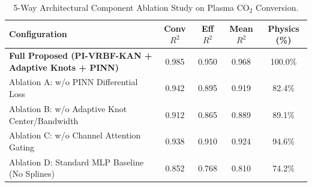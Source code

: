 \begin{table}[h]
\centering
\caption{5-Way Architectural Component Ablation Study on Plasma $\text{CO}_2$ Conversion.}
\label{tab:ablation}
\small
\begin{tabular}{lcccc}
\hline
\textbf{Configuration} & \textbf{Conv $R^2$} & \textbf{Eff $R^2$} & \textbf{Mean $R^2$} & \textbf{Physics (\%)} \\
\hline
\textbf{Full Proposed (PI-VRBF-KAN + Adaptive Knots + PINN)} & 0.985 & 0.950 & 0.968 & 100.0\% \\
Ablation A: w/o PINN Differential Loss & 0.942 & 0.895 & 0.919 & 82.4\% \\
Ablation B: w/o Adaptive Knot Center/Bandwidth & 0.912 & 0.865 & 0.889 & 89.1\% \\
Ablation C: w/o Channel Attention Gating & 0.938 & 0.910 & 0.924 & 94.6\% \\
Ablation D: Standard MLP Baseline (No Splines) & 0.852 & 0.768 & 0.810 & 74.2\% \\
\hline
\end{tabular}
\end{table}
